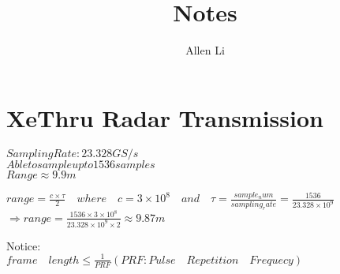 \documentclass{article}
\title{Notes}
\author{Allen Li}
\begin{document}
    \maketitle
    \section{XeThru Radar Transmission}
    \begin{flushleft}
        $Sampling Rate:23.328GS/s$\\
        $Able to sample up to 1536 samples$\\
        $Range \approx 9.9m$\\
        \begin{center}
            $range=\frac{c\times \tau}{2} \quad where \quad c=3\times 10^8 \quad and \quad \tau=\frac{sample_num}{sampling_rate}=\frac{1536}{23.328\times10^9}$\\
            $\Rightarrow range=\frac{1536\times3\times10^8}{23.328\times10^9\times2}\approx 9.87m$\\
        \end{center}
        Notice:\\
        $frame \quad length \leq \frac{1}{PRF}(PRF:Pulse \quad Repetition \quad Frequecy)$\\ 
    \end{flushleft}
\end{document}
